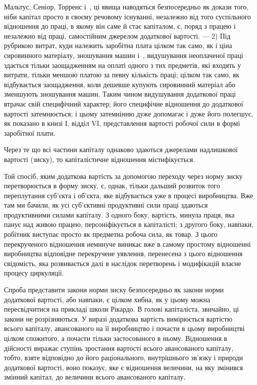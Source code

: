 \parcont{}  %
Мальтус, Сеніор, Торренс і~, ці явища наводяться безпосередньо
як докази того, ніби капітал просто в своєму речовому
існуванні, незалежно від того суспільного відношення до
праці, в якому він саме й стає капіталом, є, поряд з працею
і незалежно від праці, самостійним джерелом додаткової вартості.
— 2) Під рубрикою витрат, куди належить заробітна плата
цілком так само, як і ціна сировинного матеріалу, зношування
машин і~, видушування неоплаченої праці здається тільки
заощадженням на оплаті одного з тих предметів, які входять
у витрати, тільки меншою платою за певну кількість праці;
цілком так само, як відбувається заощадження, коли дешевше
купують сировинний матеріал або зменшують зношування машин.
Таким чином видушування додаткової праці втрачає свій
специфічний характер; його специфічне відношення до додаткової
вартості затемнюється; і цьому затемнінню дуже допомагає
і дуже його полегшує, як показано в книзі І, відділ VI,
представлення вартості робочої сили в формі заробітної плати.

Через те що всі частини капіталу однаково здаються джерелами
надлишкової вартості (зиску), то капіталістичне відношення
містифікується.

Той спосіб, яким додаткова вартість за допомогою переходу
через норму зиску перетворюється в форму зиску, є, однак,
тільки дальший розвиток того переплутання суб’єкта і об’єкта,
яке відбувається уже в процесі виробництва. Вже там ми бачили,
як усі суб’єктивні продуктивні сили праці здаються продуктивними
силами капіталу. З одного боку, вартість, минула праця,
яка панує над живою працею, персоніфікується в капіталісті;
з другого боку, навпаки, робітник виступає просто як предметна
робоча сила, як товар. З цього перекрученого відношення неминуче
виникає вже в самому простому відношенні виробництва
відповідне перекручене уявлення, перенесена з цього відношення
свідомість, яка розвивається далі в наслідок перетворень і модифікацій
власне процесу циркуляції.

Спроба представити закони норми зиску безпосередньо як закони
норми додаткової вартості, або навпаки, є цілком хибна, як
у цьому можна пересвідчитися на прикладі школи Рікардо. В голові
капіталіста, звичайно, ці закони не розрізняються. У виразі 
додаткова вартість вимірюється вартістю всього капіталу, авансованого
на її виробництво і почасти в цьому виробництві цілком спожитого,
а почасти тільки застосованого в ньому. Відношення  в
дійсності виражає ступінь зростання вартості всього авансованого
капіталу, тобто, взяте відповідно до його раціонального, внутрішнього
зв’язку і природи додаткової вартості, воно показує,
яке є відношення величини, на яку змінився змінний капітал, до
величини всього авансованого капіталу.
